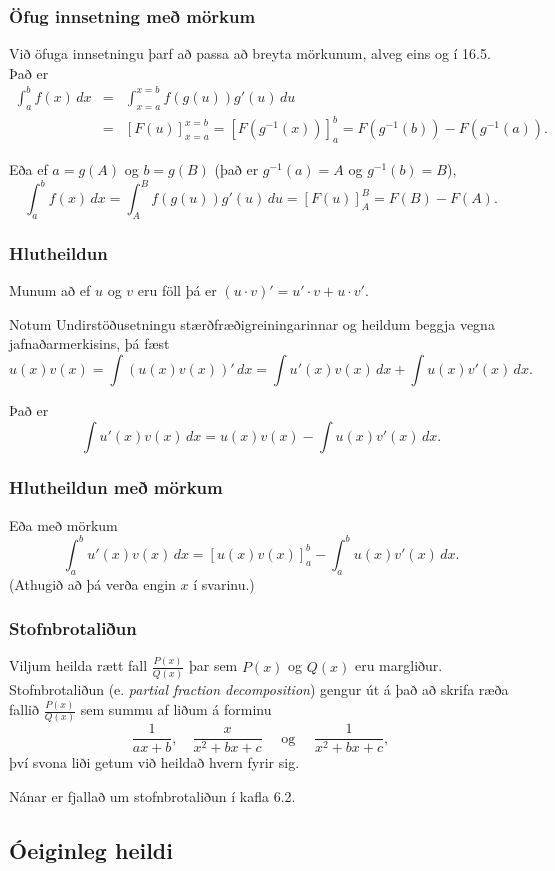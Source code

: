 \documentclass[icelandic,a4paper,12pt]{article}
\begin{document}
\subsubsection{Öfug innsetning með mörkum}
Við öfuga innsetningu þarf að passa að breyta mörkunum, alveg eins og í 16.5. 
Það er 
\begin{eqnarray*}
\int_a^b f(x)\,dx    &=& 
\int_{x=a}^{x=b} f(g(u))g'(u)\,du  \\ 
&=& [F(u)]_{x=a}^{x=b}
= [F(g^{-1}(x))]_a^b = F(g^{-1}(b)) - F(g^{-1}(a)).
\end{eqnarray*}

Eða ef $a=g(A)$ og $b=g(B)$ (það er $g^{-1}(a) = A$ og  $g^{-1}(b) = B$), 
$$
  \int_a^b f(x)\,dx  = \int_A^B f(g(u))g'(u)\,du= [F(u)]_A^B = F(B) - F(A).
$$

\subsubsection{Hlutheildun}
Munum að ef $u$ og $v$ eru föll þá er
$(u\cdot v)' = u'\cdot v + u \cdot v'$.

Notum Undirstöðusetningu stærðfræðigreiningarinnar og heildum beggja vegna
jafnaðarmerkisins, þá fæst
$$
u(x)v(x) = \int (u(x)v(x))'\, dx = \int u'(x)v(x)\, dx + \int u(x)v'(x)\, dx.
$$

Það er
$$
\int u'(x)v(x)\, dx = u(x)v(x) -  \int u(x)v'(x)\, dx.
$$

\subsubsection{Hlutheildun með mörkum}
Eða með mörkum
$$
\int_a^b u'(x)v(x)\, dx = [u(x)v(x)]_a^b -  \int_a^b u(x)v'(x)\, dx.
$$
(Athugið að þá verða engin $x$ í svarinu.)

\subsubsection{Stofnbrotaliðun}
Viljum heilda rætt fall $\frac{P(x)}{Q(x)}$ þar sem $P(x)$ og $Q(x)$
eru margliður. Stofnbrotaliðun (e. \emph{partial fraction decomposition}) 
gengur út á það að skrifa ræða fallið $\frac{P(x)}{Q(x)}$ sem summu af liðum á forminu
$$
\frac{1}{ax+b}, \quad \frac{x}{x^2+bx+c} \quad\text{ og }\quad \frac{1}{x^2+bx+c},
$$
því svona liði getum við heildað hvern fyrir sig.

Nánar er fjallað um stofnbrotaliðun í kafla 6.2.

\subsection{Óeiginleg heildi}
\end{document}
